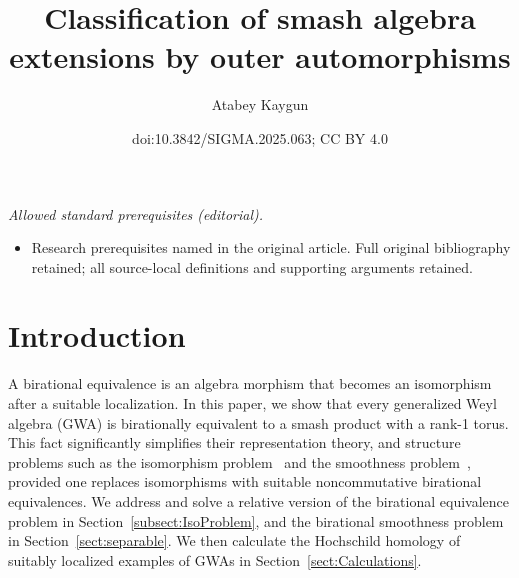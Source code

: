 \documentclass[10pt,a4paper]{amsart}
\title{Classification of smash algebra extensions by outer automorphisms}
\author{Atabey Kaygun}
\date{doi:10.3842/SIGMA.2025.063; CC BY 4.0}
\numberwithin{equation}{section}
\begin{document}
\maketitle
\noindent\textit{Allowed standard prerequisites (editorial).}\begin{itemize}
\item Research prerequisites named in the original article. Full original bibliography retained; all source-local definitions and supporting arguments retained.
\end{itemize}\medskip
\section{Introduction}

A birational equivalence is an algebra morphism that becomes an isomorphism after a suitable
localization. In this paper, we show that every generalized Weyl algebra (GWA) is birationally
equivalent to a smash product with a rank-1 torus. This fact significantly simplifies their
representation theory, and structure problems such as the isomorphism
problem~\cite{BavulaJordan:IsoProblem,Hodges:NCDeformations, RichardSolotar:IsoProblem,
 AlvarezVivaz:IsomorphismsOfQGWAs, Tang:IsoProblem} and the smoothness
problem~\cite{Bavula:GlobalDim, Hodges:NCDeformations,
 Liu:HomologicalSmoothnessI,Liu:HomologicalSmoothnessII, SolotarAlvarezVivas:QuantumGeneralizedWeyl}, provided one replaces isomorphisms with
suitable noncommutative birational equivalences. We address and solve a relative version of the
birational equivalence problem in Section~\ref{subsect:IsoProblem}, and the birational smoothness
problem in Section~\ref{sect:separable}. We then calculate the Hochschild homology of suitably
localized examples of GWAs in Section~\ref{sect:Calculations}.
\end{document}
